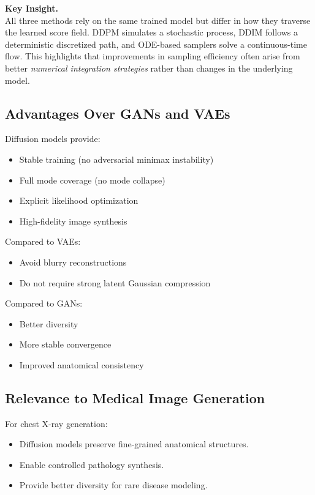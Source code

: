 \vspace{0.5em}
\noindent
\textbf{Key Insight.} \\
All three methods rely on the same trained model but differ in how they traverse the learned score field. DDPM simulates a stochastic process, DDIM follows a deterministic discretized path, and ODE-based samplers solve a continuous-time flow. This highlights that improvements in sampling efficiency often arise from better \textit{numerical integration strategies} rather than changes in the underlying model.

\subsection{Advantages Over GANs and VAEs}

Diffusion models provide:

\begin{itemize}
    \item Stable training (no adversarial minimax instability)
    \item Full mode coverage (no mode collapse)
    \item Explicit likelihood optimization
    \item High-fidelity image synthesis
\end{itemize}

Compared to VAEs:
\begin{itemize}
    \item Avoid blurry reconstructions
    \item Do not require strong latent Gaussian compression
\end{itemize}

Compared to GANs:
\begin{itemize}
    \item Better diversity
    \item More stable convergence
    \item Improved anatomical consistency
\end{itemize}

\subsection{Relevance to Medical Image Generation}

For chest X-ray generation:

\begin{itemize}
    \item Diffusion models preserve fine-grained anatomical structures.
    \item Enable controlled pathology synthesis.
    \item Provide better diversity for rare disease modeling.
\end{itemize}

